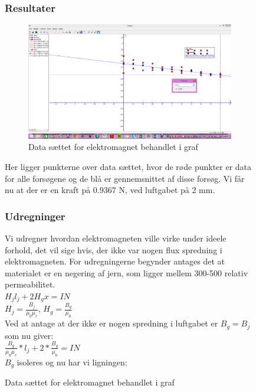 \begin{figure}
\subsubsection*{Resultater}
\begin{figure}[h!]
\center
\includegraphics[scale=0.3]{./Graphics/Graf_Elektromagnet_resultater}
\caption{Data sættet for elektromagnet behandlet i graf}
\label{Elektromagnet}
\end{figure}

Her ligger punkterne over data sættet, hvor de røde punkter er data for alle forsøgene og de blå er gennemsnittet af disse forsøg. Vi får nu at der er en kraft på 0.9367 N, ved luftgabet på 2 mm.

\subsubsection*{Udregninger}
Vi udregner hvordan elektromagneten ville virke under ideele forhold, det vil sige hvis, der ikke var nogen flux spredning i elektromagneten. For udregningerne begynder antages det at materialet er en negering af jern, som ligger mellem 300-500 relativ permeabilitet.\\

$H_{j}l_{j}+2H_{g}x=IN$ \\

$H_{j}=\frac{B_{j}}{\mu_{0}\mu_{r}},\,H_{g}=\frac{B_{g}
}{\mu_{0}}$\\

Ved at antage at der ikke er nogen spredning i luftgabet er $B_{g}=B_{j}$ som nu giver:\\

$\frac{B_{g}}{\mu_{0}\mu_{r}}*l_{j}+2*\frac{B_{g}}{\mu_{0}}=IN$\\

$B_{g}$ isoleres og nu har vi ligningen:\\


\end{figure}
